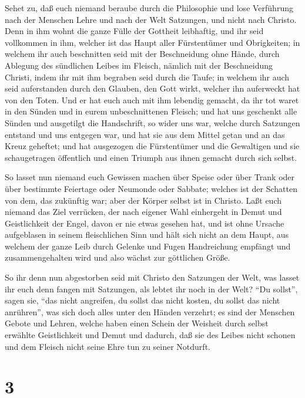  Sehet zu, daß euch niemand beraube durch die Philosophie
und lose Verführung nach der Menschen Lehre und nach der Welt Satzungen,
und nicht nach Christo.  Denn in ihm wohnt die ganze Fülle
der Gottheit leibhaftig,  und ihr seid vollkommen in ihm,
welcher ist das Haupt aller Fürstentümer und Obrigkeiten; 
in welchem ihr auch beschnitten seid mit der Beschneidung ohne Hände,
durch Ablegung des sündlichen Leibes im Fleisch, nämlich mit der
Beschneidung Christi,  indem ihr mit ihm begraben seid
durch die Taufe; in welchem ihr auch seid auferstanden durch den
Glauben, den Gott wirkt, welcher ihn auferweckt hat von den Toten.
 Und er hat euch auch mit ihm lebendig gemacht, da ihr tot
waret in den Sünden und in eurem unbeschnittenen Fleisch; und hat uns
geschenkt alle Sünden  und ausgetilgt die Handschrift, so
wider uns war, welche durch Satzungen entstand und uns entgegen war, und
hat sie aus dem Mittel getan und an das Kreuz geheftet; 
und hat ausgezogen die Fürstentümer und die Gewaltigen und sie
schaugetragen öffentlich und einen Triumph aus ihnen gemacht durch sich
selbst.

 So lasset nun niemand euch Gewissen machen über Speise
oder über Trank oder über bestimmte Feiertage oder Neumonde oder
Sabbate;  welches ist der Schatten von dem, das zukünftig
war; aber der Körper selbst ist in Christo.  Laßt euch
niemand das Ziel verrücken, der nach eigener Wahl einhergeht in Demut
und Geistlichkeit der Engel, davon er nie etwas gesehen hat, und ist
ohne Ursache aufgeblasen in seinem fleischlichen Sinn  und
hält sich nicht an dem Haupt, aus welchem der ganze Leib durch Gelenke
und Fugen Handreichung empfängt und zusammengehalten wird und also
wächst zur göttlichen Größe.

 So ihr denn nun abgestorben seid mit Christo den Satzungen
der Welt, was lasset ihr euch denn fangen mit Satzungen, als lebtet ihr
noch in der Welt?  ``Du sollst'', sagen sie, ``das nicht
angreifen, du sollst das nicht kosten, du sollst das nicht anrühren'',
 was sich doch alles unter den Händen verzehrt; es sind der
Menschen Gebote und Lehren,  welche haben einen Schein der
Weisheit durch selbst erwählte Geistlichkeit und Demut und dadurch, daß
sie des Leibes nicht schonen und dem Fleisch nicht seine Ehre tun zu
seiner Notdurft.

\hypertarget{section-2}{%
\section{3}\label{section-2}}

